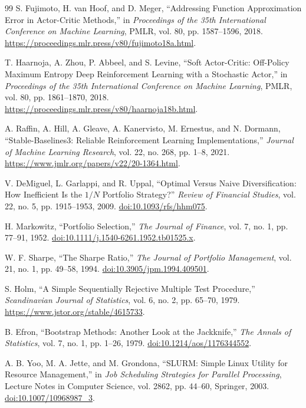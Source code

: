 \documentclass[12pt,a4paper,oneside]{book}
\theoremstyle{plain}
\numberwithin{equation}{chapter} \DeclareMathOperator{\Var}{Var}
\begin{document}
\begin{thebibliography}{99}
S. Fujimoto, H. van Hoof, and D. Meger, “Addressing Function Approximation Error in Actor-Critic Methods,” in \emph{Proceedings of the 35th International Conference on Machine Learning}, PMLR, vol. 80, pp. 1587--1596, 2018. \url{https://proceedings.mlr.press/v80/fujimoto18a.html}.

T. Haarnoja, A. Zhou, P. Abbeel, and S. Levine, “Soft Actor-Critic: Off-Policy Maximum Entropy Deep Reinforcement Learning with a Stochastic Actor,” in \emph{Proceedings of the 35th International Conference on Machine Learning}, PMLR, vol. 80, pp. 1861--1870, 2018. \url{https://proceedings.mlr.press/v80/haarnoja18b.html}.

A. Raffin, A. Hill, A. Gleave, A. Kanervisto, M. Ernestus, and N. Dormann, “Stable-Baselines3: Reliable Reinforcement Learning Implementations,” \emph{Journal of Machine Learning Research}, vol. 22, no. 268, pp. 1--8, 2021. \url{https://www.jmlr.org/papers/v22/20-1364.html}.

V. DeMiguel, L. Garlappi, and R. Uppal, “Optimal Versus Naive Diversification: How Inefficient Is the $1/N$ Portfolio Strategy?” \emph{Review of Financial Studies}, vol. 22, no. 5, pp. 1915--1953, 2009. \href{https://doi.org/10.1093/rfs/hhm075}{doi:10.1093/rfs/hhm075}.

H. Markowitz, “Portfolio Selection,” \emph{The Journal of Finance}, vol. 7, no. 1, pp. 77--91, 1952. \href{https://doi.org/10.1111/j.1540-6261.1952.tb01525.x}{doi:10.1111/j.1540-6261.1952.tb01525.x}.

W. F. Sharpe, “The Sharpe Ratio,” \emph{The Journal of Portfolio Management}, vol. 21, no. 1, pp. 49--58, 1994. \href{https://doi.org/10.3905/jpm.1994.409501}{doi:10.3905/jpm.1994.409501}.

S. Holm, “A Simple Sequentially Rejective Multiple Test Procedure,” \emph{Scandinavian Journal of Statistics}, vol. 6, no. 2, pp. 65--70, 1979. \url{https://www.jstor.org/stable/4615733}.

B. Efron, “Bootstrap Methods: Another Look at the Jackknife,” \emph{The Annals of Statistics}, vol. 7, no. 1, pp. 1--26, 1979. \href{https://doi.org/10.1214/aos/1176344552}{doi:10.1214/aos/1176344552}.

A. B. Yoo, M. A. Jette, and M. Grondona, “SLURM: Simple Linux Utility for Resource Management,” in \emph{Job Scheduling Strategies for Parallel Processing}, Lecture Notes in Computer Science, vol. 2862, pp. 44--60, Springer, 2003. \href{https://doi.org/10.1007/10968987_3}{doi:10.1007/10968987\_3}.


\end{thebibliography}
\end{document}
